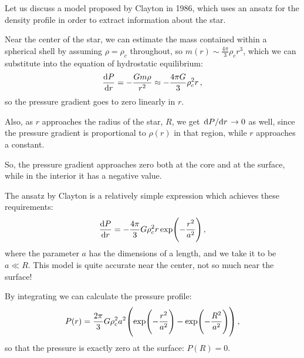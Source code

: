 \documentclass[main.tex]{subfiles}
\begin{document}
Let us discuss a model proposed by Clayton in 1986, which uses an ansatz for the density profile in order to extract information about the star.


Near the center of the star, we can estimate the mass contained within a spherical shell by assuming \(\rho = \rho _c\) throughout, so \(m(r) \sim \frac{4 \pi }{3} \rho _c r^3\), which we can substitute into the equation of hydrostatic equilibrium:
%
\begin{align}
  \dv{P}{r} = - \frac{Gm \rho }{r^2} \approx -\frac{4 \pi G}{3} \rho^2_c r 
\,,
\end{align}
%
so the pressure gradient goes to zero linearly in \(r\). 


Also, as \(r\) approaches the radius of the star, \(R\), we get \(\dv*{P}{r} \rightarrow 0\) as well, since the pressure gradient is proportional to \(\rho (r)\) in that region, while \(r\) approaches a constant. 

So, the pressure gradient approaches zero both at the core and at the surface, while in the interior it has a negative value.

The ansatz by Clayton is a relatively simple expression which achieves these requirements:
%
\begin{align}
  \dv{P}{r} = -\frac{4 \pi }{3} G \rho _c^2 r \exp(- \frac{r^2}{a^2})
\,,
\end{align}
%
where the parameter \(a\) has the dimensions of a length, and we take it to be \(a \ll R \).
This model is quite accurate near the center, not so much near the surface! 

By integrating we can calculate the pressure profile:
%
\begin{align}
  P(r) = \frac{2 \pi }{3} G \rho_c^2 a^2 \qty(\exp(- \frac{r^2}{a^2}) - \exp(- \frac{R^2}{a^2}))
\,,
\end{align}
%
so that the pressure is exactly zero at the surface: \(P(R) = 0\).
\end{document}
